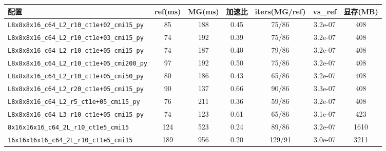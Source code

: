 \begin{tabular}{lcccccc}
\hline
配置 & ref(ms) & MG(ms) & 加速比 & iters(MG/ref) & vs\_ref & 显存(MB) \\
\hline
\texttt{L8x8x8x16\_c64\_L2\_r10\_ct1e+02\_cmi15\_py} & 85 & 188 & 0.45 & 75/86 & 3.2e-07 & 408 \\
\texttt{L8x8x8x16\_c64\_L2\_r10\_ct1e+03\_cmi15\_py} & 74 & 192 & 0.39 & 75/86 & 3.2e-07 & 408 \\
\texttt{L8x8x8x16\_c64\_L2\_r10\_ct1e+05\_cmi15\_py} & 74 & 187 & 0.40 & 79/86 & 3.2e-07 & 408 \\
\texttt{L8x8x8x16\_c64\_L2\_r10\_ct1e+05\_cmi200\_py} & 97 & 192 & 0.50 & 75/86 & 3.2e-07 & 408 \\
\texttt{L8x8x8x16\_c64\_L2\_r10\_ct1e+05\_cmi50\_py} & 80 & 186 & 0.43 & 65/86 & 3.2e-07 & 408 \\
\texttt{L8x8x8x16\_c64\_L2\_r20\_ct1e+05\_cmi15\_py} & 90 & 137 & 0.66 & 90/86 & 3.3e-07 & 408 \\
\texttt{L8x8x8x16\_c64\_L2\_r5\_ct1e+05\_cmi15\_py} & 76 & 211 & 0.36 & 59/86 & 3.2e-07 & 408 \\
\texttt{L8x8x8x16\_c64\_L3\_r10\_ct1e+05\_cmi15\_py} & 74 & 123 & 0.61 & 65/86 & 3.1e-07 & 423 \\
\texttt{8x16x16x16\_c64\_2L\_r10\_ct1e5\_cmi15} & 124 & 523 & 0.24 & 89/86 & 3.2e-07 & 1610 \\
\texttt{16x16x16x16\_c64\_2L\_r10\_ct1e5\_cmi15} & 189 & 956 & 0.20 & 129/91 & 3.0e-07 & 3211 \\
\hline
\end{tabular}

